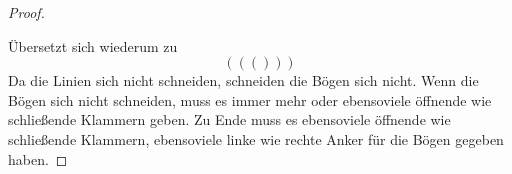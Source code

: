\documentclass{scrartcl} %
\begin{document}
\begin{aufgabe}
\begin{enumerate}[label=(\alph*)]
\begin{proof}
\begin{center}
                \end{center}
                Übersetzt sich wiederum zu
                \[
                    ((()))
                \]
                Da die Linien sich nicht schneiden, schneiden die Bögen sich nicht. Wenn die Bögen sich nicht schneiden, muss es immer mehr oder ebensoviele öffnende wie schließende Klammern geben. Zu Ende muss es ebensoviele öffnende wie schließende Klammern, ebensoviele linke wie rechte Anker für die Bögen gegeben haben.
            \end{proof}
        \end{enumerate}
    \end{aufgabe}
\end{document}
